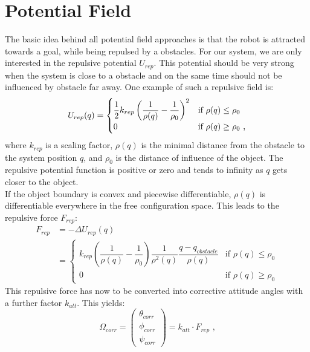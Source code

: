 \section{Potential Field}
\label{sec:potential field}
The basic idea behind all potential field approaches is that the robot is attracted towards a goal, while being repulsed by a obstacles. For our system, we are only interested in the repulsive potential $U_{rep}$. This potential should be very strong when the system is close to a obstacle and on the same time should not be influenced by obstacle far away. One example of such a repulsive field is:
\begin{equation}
\label{eq:pot field}
\centering
U_{rep}(q)=\begin{cases}
\dfrac{1}{2}k_{rep}\left(\dfrac{1}{\rho (q)}-\dfrac{1}{\rho_0}\right)^2 & \text{if } \rho(q)\leq\rho_0 \\
0 & \text{if } \rho(q)\geq\rho_0 \text{ ,}
\end{cases}
\end{equation}
where $k_{rep}$ is a scaling factor, $\rho(q)$ is the minimal distance from the obstacle to the system position $q$, and $\rho_0$ is the distance of influence of the object. The repulsive potential function is positive or zero and tends to infinity as $q$ gets closer to the object.\\
If the object boundary is convex and piecewise differentiable, $\rho(q)$ is differentiable everywhere in the free configuration space. This leads to the repulsive force $F_{rep}$:
\begin{equation}
\label{eq:force}
\begin{split}
F_{rep} &=-\Delta U_{rep}(q)\\
&=	\begin{cases}
k_{rep}\left(\dfrac{1}{\rho(q)}-\dfrac{1}{\rho_0}\right)\dfrac{1}{\rho^2(q)}\dfrac{q-q_{obstacle}}{\rho(q)} & \text{if }\rho(q)\leq\rho_0\\
0 & \text{if }\rho(q)\geq\rho_0
\end{cases}
\end{split}
\end{equation}
This repulsive force has now to be converted into corrective attitude angles with a further factor $k_{att}$. This yields: 
\begin{equation}
	\label{eq:angles}
	\Omega_{corr} =\begin{pmatrix}
	\theta_{corr} \\ \phi_{corr} \\ \psi_{corr}
	\end{pmatrix} = k_{att}\cdot F_{rep} \text{ ,}
\end{equation}
